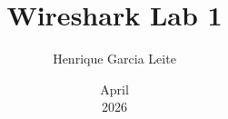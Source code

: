 \documentclass[a4paper, answers]{exam}
\title{Wireshark Lab 1}
\author{Henrique Garcia Leite}
\date{April\\2026}
\begin{document}
\begin{titlepage}
    \maketitle
\end{titlepage}





\end{document}
